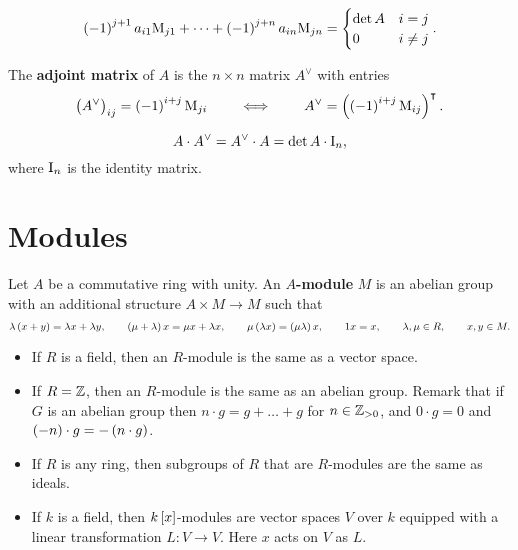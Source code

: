 \begin{proposition}
$$ \br{-1}^{j + 1}a_{i1}\M_{j1} + \dots + \br{-1}^{j + n}a_{in}\M_{jn} =
\begin{cases}
\det A & i = j \\
0 & i \ne j
\end{cases}.
$$
\end{proposition}

\begin{definition}
The \textbf{adjoint matrix} of $ A $ is the $ n \times n $ matrix $ A^\vee $ with entries
$$ \br{A^\vee}_{ij} = \br{-1}^{i + j}\M_{ji} \qquad \iff \qquad A^\vee = \br{\br{-1}^{i + j}\M_{ij}}^\intercal. $$
\end{definition}

\begin{theorem}
\label{thm:8.5}
$$ A \cdot A^\vee = A^\vee \cdot A = \det A \cdot \mathrm{I}_n, $$
where $ \mathrm{I}_n $ is the identity matrix.
\end{theorem}

\section{Modules}

\begin{definition}
Let $ A $ be a commutative ring with unity. An \textbf{$ A $-module} $ M $ is an abelian group with an additional structure $ A \times M \to M $ such that
$$ \lambda\br{x + y} = \lambda x + \lambda y, \qquad \br{\mu + \lambda}x = \mu x + \lambda x, \qquad \mu\br{\lambda x} = \br{\mu\lambda}x, \qquad 1x = x, \qquad \lambda, \mu \in R, \qquad x, y \in M. $$
\end{definition}

\begin{example}
\hfill
\begin{itemize}
\item If $ R $ is a field, then an $ R $-module is the same as a vector space.
\item If $ R = \mathbb{Z} $, then an $ R $-module is the same as an abelian group. Remark that if $ G $ is an abelian group then $ n \cdot g = g + \dots + g $ for $ n \in \mathbb{Z}_{> 0} $, and $ 0 \cdot g = 0 $ and $ \br{-n} \cdot g = -\br{n \cdot g} $.
\item If $ R $ is any ring, then subgroups of $ R $ that are $ R $-modules are the same as ideals.
\item If $ k $ is a field, then $ k\sbr{x} $-modules are vector spaces $ V $ over $ k $ equipped with a linear transformation $ L : V \to V $. Here $ x $ acts on $ V $ as $ L $.
\end{itemize}
\end{example}

